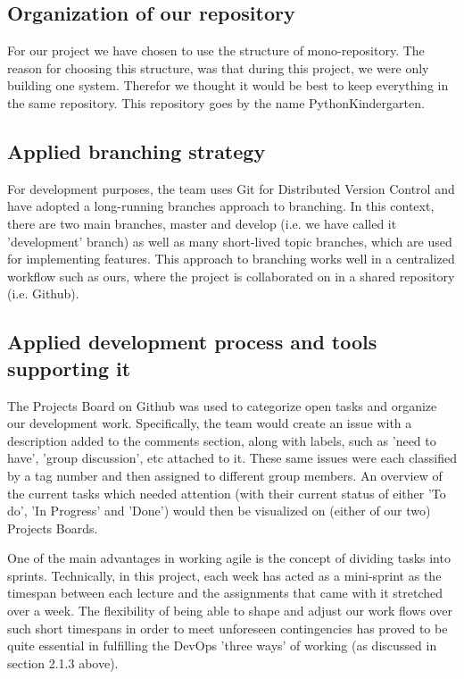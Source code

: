 \subsection{Organization of our repository}
For our project we have chosen to use the structure of mono-repository. The reason for choosing this structure, was that during this project, we were only building one system. Therefor we thought it would be best to keep everything in the same repository. This repository goes by the name PythonKindergarten. \newline

\subsection{Applied branching strategy}
For development purposes, the team uses Git for Distributed Version Control and have adopted a long-running branches approach to branching. In this context, there are two main branches, master and develop (i.e. we have called it 'development' branch) as well as many short-lived topic branches, which are used for implementing features. This approach to branching works well in a centralized workflow such as ours, where the project is collaborated on in a shared repository (i.e. Github).

\subsection{Applied development process and tools supporting it}
The Projects Board on Github was used to categorize open tasks and organize our development work. Specifically, the team would create an issue with a description added to the comments section, along with labels, such as 'need to have', 'group discussion', etc attached to it. These same issues were each classified by a tag number and then assigned to different group members. An overview of the current tasks which needed attention (with their current status of either 'To do', 'In Progress' and 'Done') would then be visualized on (either of our two) Projects Boards.

One of the main advantages in working agile is the concept of dividing tasks into sprints. 
Technically, in this project, each week has acted as a mini-sprint as the timespan between each lecture and the assignments that came with it stretched over a week. The flexibility of being able to shape and adjust our work flows over such short timespans in order to meet unforeseen contingencies has proved to be quite essential in fulfilling the DevOps 'three ways' of working (as discussed in section 2.1.3 above).  
  
